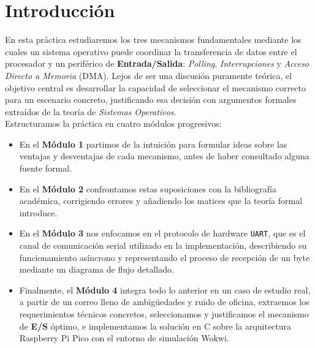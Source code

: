 \documentclass[12pt,letterpaper]{article}
\begin{document}


\newpage

\section*{Introducción}

En esta práctica estudiaremos los tres mecanismos fundamentales mediante los cuales un sistema operativo puede
coordinar la transferencia de datos entre el procesador y un periférico de \textbf{Entrada/Salida}:
\textit{Polling}, \textit{Interrupciones} y \textit{Acceso Directo a Memoria} (DMA). Lejos de ser una discusión
puramente teórica, el objetivo central es desarrollar la capacidad de seleccionar el mecanismo correcto para un
escenario concreto, justificando esa decisión con argumentos formales extraídos de la teoría de
\textit{Sistemas Operativos}.\\

Estructuramos la práctica en cuatro módulos progresivos:

\begin{itemize}
\item En el \textbf{Módulo 1} partimos de la intuición para formular ideas sobre las ventajas y desventajas
  de cada mecanismo, antes de haber consultado alguna fuente formal.\\
\item En el \textbf{Módulo 2} confrontamos estas suposiciones con la bibliografía académica, corrigiendo errores
  y añadiendo los matices que la teoría formal introduce.
\item En el \textbf{Módulo 3} nos enfocamos en el protocolo de hardware \texttt{UART}, que es el canal de
  comunicación serial utilizado en la implementación, describiendo su funcionamiento asíncrono y representando
  el proceso de recepción de un byte mediante un diagrama de flujo detallado.
\item Finalmente, el \textbf{Módulo 4} integra todo lo anterior en un caso de estudio real, a partir de un correo
  lleno de ambigüedades y ruido de oficina, extraemos los requerimientos técnicos concretos, seleccionamos y
  justificamos el mecanismo de \textbf{E/S} óptimo, e implementamos la solución en C sobre la arquitectura
  Raspberry Pi Pico con el entorno de simulación Wokwi.
\end{itemize}
\end{document}
